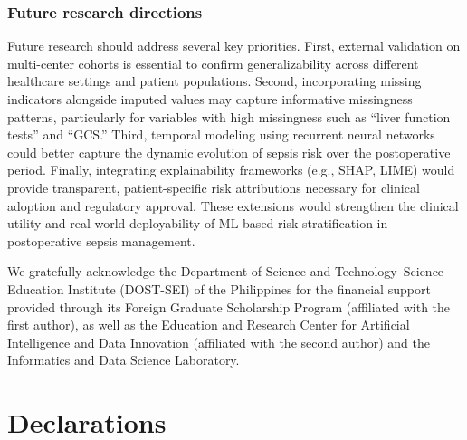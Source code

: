 \documentclass[pdflatex,sn-mathphys-num]{sn-jnl}%
\theoremstyle{thmstyleone}%
\theoremstyle{thmstyletwo}%
\theoremstyle{thmstylethree}%
\begin{document}
\subsubsection{Future research directions}
Future research should address several key priorities. First, external validation on multi-center cohorts is essential to confirm generalizability across different healthcare settings and patient populations. Second, incorporating missing indicators alongside imputed values may capture informative missingness patterns, particularly for variables with high missingness such as ``liver function tests'' and ``GCS.'' Third, temporal modeling using recurrent neural networks could better capture the dynamic evolution of sepsis risk over the postoperative period. Finally, integrating explainability frameworks (e.g., SHAP, LIME) would provide transparent, patient-specific risk attributions necessary for clinical adoption and regulatory approval. These extensions would strengthen the clinical utility and real-world deployability of ML-based risk stratification in postoperative sepsis management. 


We gratefully acknowledge the Department of Science and Technology--Science Education Institute (DOST-SEI) of the Philippines for the financial support provided through its Foreign Graduate Scholarship Program (affiliated with the first author), as well as the Education and Research Center for Artificial Intelligence and Data Innovation (affiliated with the second author) and the Informatics and Data Science Laboratory.

\section*{Declarations}
\end{document}
